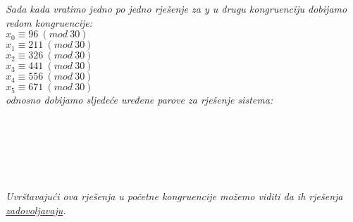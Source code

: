 \documentclass[12pt]{article}
\begin{document}
\begin{enumerate}
\begin{center}
            \vspace*{0.25cm}
            \textit{Sada kada vratimo jedno po jedno rješenje za y u drugu kongruenciju dobijamo redom kongruencije:\\
            $x_0 \equiv 96 \ (mod\ 30)$\\
            $x_1 \equiv 211 \ (mod\ 30)$\\
            $x_2 \equiv 326 \ (mod\ 30)$\\
            $x_3 \equiv 441 \ (mod\ 30)$\\
            $x_4 \equiv 556 \ (mod\ 30)$\\
            $x_5 \equiv 671 \ (mod\ 30)$\\
            \vspace{0.15cm}
             odnosno dobijamo sljedeće uređene parove za rješenje sistema: \\
             \vspace{0.15cm}
             \\
             \vspace{0.15cm}
             \\}
             \vspace{0.15cm}
             \\
             \vspace{0.15cm}
             \\
             \vspace{0.15cm}
             \\
             \vspace{0.15cm}
             \\
            \vspace*{0.25cm}
            \textit{Uvrštavajući ova rješenja u početne kongruencije možemo viditi da ih rješenja \underline{zadovoljavaju}.
            }
            

\end{center}
\end{enumerate}
\end{document}
